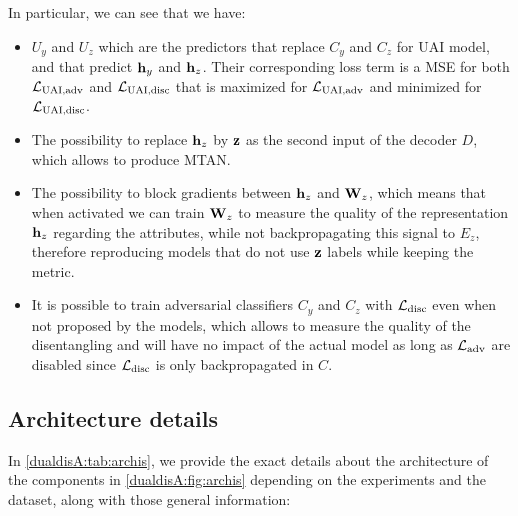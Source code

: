 In particular, we can see that we have:
\begin{itemize}
    \item $U_y$ and $U_z$ which are the predictors that replace $C_y$ and $C_z$ for UAI model, and that predict $\mathbf{h}_y$ and $\mathbf{h}_z$. Their corresponding loss term is a MSE for both $\mathcal{L}_\textrm{UAI,adv}$ and $\mathcal{L}_\textrm{UAI,disc}$ that is maximized for $\mathcal{L}_\textrm{UAI,adv}$ and minimized for $\mathcal{L}_\textrm{UAI,disc}$.
    \item The possibility to replace $\mathbf{h}_z$ by $\mathbf{z}$ as the second input of the decoder $D$, which allows to produce MTAN.
    \item The possibility to block gradients between $\mathbf{h}_z$ and $\mathbf{W}_z$, which means that when activated we can train $\mathbf{W}_z$ to measure the quality of the representation $\mathbf{h}_z$ regarding the attributes, while not backpropagating this signal to $E_z$, therefore reproducing models that do not use $\mathbf{z}$ labels while keeping the metric.
    \item It is possible to train adversarial classifiers $C_y$ and $C_z$ with $\mathcal{L}_\textrm{disc}$ even when not proposed by the models, which allows to measure the quality of the disentangling and will have no impact of the actual model as long as $\mathcal{L}_\textrm{adv}$ are disabled since $\mathcal{L}_\textrm{disc}$ is only backpropagated in $C$.
\end{itemize}

\clearpage

\subsection{Architecture details}

In \autoref{dualdisA:tab:archis}, we provide the exact details about the architecture of the components in \autoref{dualdisA:fig:archis} depending on the experiments and the dataset, along with those general information:


\newcommand{\nlspace}{\rule{0pt}{9pt}}
\newcommand{\li}{$\ell$}

